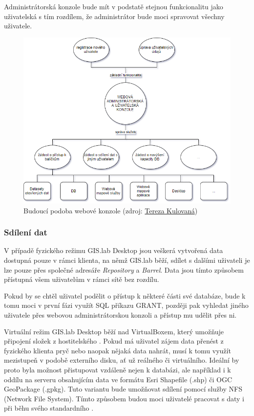 Administrátorská konzole bude mít v podstatě stejnou funkcionalitu
jako uživatelská s tím rozdílem, že administrátor bude moci spravovat
všechny uživatele.

\begin{figure}[H] \centering
    \includegraphics[width=400pt]{./pictures/console_services_02.png}
    \caption[Budoucí podoba webové konzole]{Budoucí podoba webové konzole (zdroj:
	\href{}{Tereza Kulovaná})}
    \label{fig:konzole-sluzby}
\end{figure}

\subsubsection{Sdílení dat}
V případě fyzického režimu GIS.lab Desktop jsou veškerá vytvořená data
dostupná pouze v rámci klienta, na němž GIS.lab běží, sdílet s dalšími
uživateli je lze pouze přes společné adresáře \textit{Repository} a
\textit{Barrel}. Data jsou tímto způsobem přístupná všem uživatelům v
rámci sítě bez rozdílu.

Pokud by se chtěl uživatel podělit o přístup k některé části své
databáze, bude k tomu moci v první fázi využít SQL příkazu GRANT,
později pak vyhledat jiného uživatele přes webovou administrátorskou
konzoli a přístup mu udělit přes ni.

Virtuální režim GIS.lab Desktop běží nad VirtualBoxem, který umožňuje 
připojení složek z hostitelského . Pokud má uživatel zájem data 
přenést z fyzického klienta pryč nebo naopak nějaká
data nahrát, musí k tomu využít mezistupeň v podobě externího disku,
ať už reálného či virtuálního. Ideální by proto byla možnost
přistupovat vzdáleně nejen k databázi, ale například i k oddílu na
serveru obsahujícím data ve formátu Esri Shapefile (.shp) či OGC
GeoPackage (.gpkg). Tuto variantu bude umožňovat sdílení pomocí služby
NFS (Network File System). Tímto způsobem budou moci uživatelé
pracovat s daty i při běhu svého standardního .

